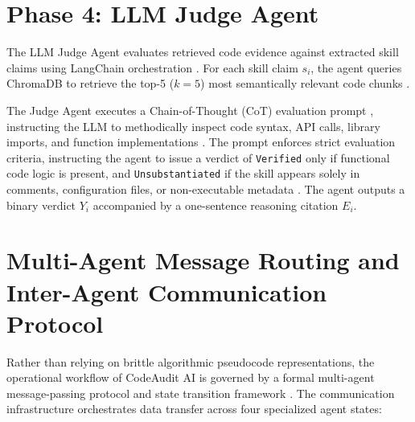 \section{Phase 4: LLM Judge Agent}

The LLM Judge Agent evaluates retrieved code evidence against extracted skill claims using LangChain orchestration \cite{ref27}. For each skill claim $s_i$, the agent queries ChromaDB to retrieve the top-5 ($k=5$) most semantically relevant code chunks \cite{ref30, ref32}.

The Judge Agent executes a Chain-of-Thought (CoT) evaluation prompt \cite{ref42}, instructing the LLM to methodically inspect code syntax, API calls, library imports, and function implementations \cite{ref10, ref25}. The prompt enforces strict evaluation criteria, instructing the agent to issue a verdict of \texttt{Verified} only if functional code logic is present, and \texttt{Unsubstantiated} if the skill appears solely in comments, configuration files, or non-executable metadata \cite{ref11, ref43}. The agent outputs a binary verdict $Y_i$ accompanied by a one-sentence reasoning citation $E_i$.

\section{Multi-Agent Message Routing and Inter-Agent Communication Protocol}

Rather than relying on brittle algorithmic pseudocode representations, the operational workflow of CodeAudit AI is governed by a formal multi-agent message-passing protocol and state transition framework \cite{ref30, ref37, ref43}. The communication infrastructure orchestrates data transfer across four specialized agent states:

